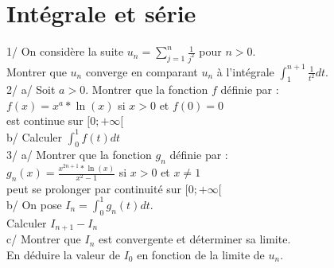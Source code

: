 \documentclass[a4paper,11pt]{book}
\begin{document}
\section{Int\'egrale et s\'erie}
1/ On consid\`ere la suite $\displaystyle u_n=\sum_{j=1}^n \frac{1}{j^2}$ pour 
$n>0$.\\
Montrer que $u_n$ converge en comparant $u_n$ \`a l'int\'egrale 
$\displaystyle \int_1^{n+1} \frac{1}{t^2} dt$.\\
2/ a/ Soit $a>0$. Montrer que la fonction $f$ d\'efinie par :\\
 $f(x)=x^a*\ln(x)$ si $x>0$ et $f(0)=0$ \\
est continue sur $[0; +\infty[$\\
b/ Calculer $\int_0^1 f(t) dt$\\
3/ a/ Montrer que la fonction $g_n$ d\'efinie par :\\
 $\displaystyle g_n(x)=\frac{x^{2n+1}*\ln(x)}{x^2-1}$ si $x>0$ et $x\neq 1$ \\
peut se prolonger par continuit\'e sur $[0; +\infty[$\\
b/ On pose $I_n=\int_0^1 g_n(t) dt$.\\
Calculer $I_{n+1}-I_n$\\
c/ Montrer que $I_n$ est convergente et d\'eterminer sa limite.\\
En d\'eduire la valeur de $I_0$  en fonction de la limite de $u_n$.
\end{document}
